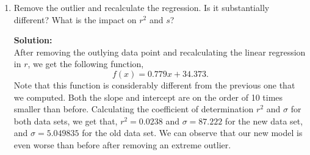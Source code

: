 \documentclass[12pt]{article}
\makeatletter
\theoremstyle{homework}
\newenvironment{exercise}[1]
{\def\@currentlabel{#1}\exercisecore}
{\endexercisecore}
\newcommand{\localhead}[1]{\par\smallskip\noindent\textbf{#1}\nobreak\\}%
\newcommand\solution{\localhead{Solution:}}
\makeatother
\begin{document}
\begin{exercise}{12.24}
\begin{enumerate}
    \item Remove the outlier and recalculate the regression. Is it substantially different? What is the impact on $r^2$ and $s$?\\
    \solution After removing the outlying data point and recalculating the linear regression in $r$,
    we get the following function,
    \begin{equation*}
      f(x) = 0.779x + 34.373.
    \end{equation*}
    Note that this function is considerably different from the previous one that we computed. Both the slope and intercept are on the
    order of 10 times smaller than before. Calculating the coefficient of determination $r^2$ and $\sigma$ for both data sets, we get that,
    $r^2 = 0.0238$ and $\sigma =  87.222$ for the new data set, and $\sigma = 5.049835$ for the old data set. We can observe that our new model 
    is even worse than before after removing an extreme outlier.
  \end{enumerate}
\end{exercise}
\vspace{.5in}
\end{document}
